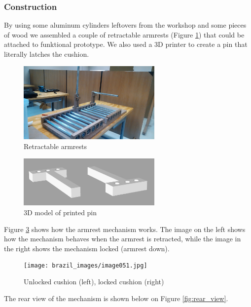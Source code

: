 \subsubsection{Construction}
By using some aluminum cylinders leftovers from the workshop and some pieces of wood we assembled a couple of retractable armrests (Figure \ref{fig:retractable_armrest}) that could be attached to funktional prototype. We also used a 3D printer to create a pin that literally latches the cushion.

\begin{figure}[h]
\centering
\includegraphics[width=7cm]{brazil_images/image049.jpg}
\caption{Retractable armrests}
\label{fig:retractable_armrest}
\end{figure}


\begin{figure}[h]
\centering
\includegraphics[width=7cm]{brazil_images/image050.png}
\caption{3D model of printed pin}
\label{fig:model_printed_pin}
\end{figure}

Figure \ref{fig:cushion} shows how the armrest mechanism works. The image on the left shows how the mechanism behaves when the armrest is retracted, while the image in the right shows the mechanism locked (armrest down).

\begin{figure}[h]
\centering
\texttt{[image: brazil\_images/image051.jpg]}
\caption{Unlocked cushion (left), locked cushion (right)}
\label{fig:cushion}
\end{figure}


The rear view of the mechanism is shown below on Figure \ref{fig:rear_view}.

